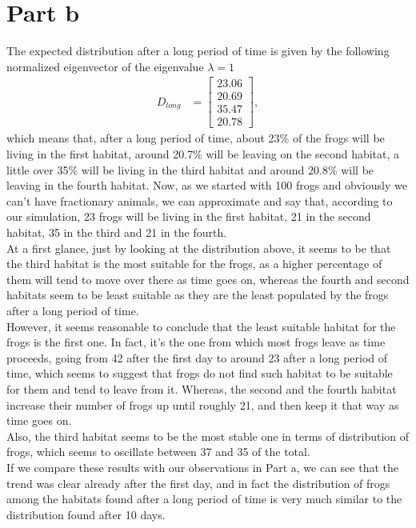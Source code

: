 \section{Part b}
The expected distribution after a long period of time is given by the following normalized eigenvector of the eigenvalue $\lambda=1$
\begin{align*}
    \textbf{$D_{long}$} &= \begin{bmatrix}
           23.06 \\
           20.69 \\
           35.47\\
           20.78
         \end{bmatrix},
\end{align*}
which means that, after a long period of time, about 23\% of the frogs will be living in the first habitat, around 20.7\% will be leaving on the second habitat, a little over 35\% will be living in the third habitat and around 20.8\% will be leaving in the fourth habitat. Now, as we started with 100 frogs and obviously we can't have fractionary animals, we can approximate and say that, according to our simulation, 23 frogs will be living in the first habitat, 21 in the second habitat, 35 in the third and 21 in the fourth. \\
At a first glance, just by looking at the distribution above, it seems to be that the third habitat is the most suitable for the frogs, as a higher percentage of them will tend to move over there as time goes on, whereas the fourth and second habitats seem to be least suitable as they are the least populated by the frogs after a long period of time.\\
However, it seems reasonable to conclude that the least suitable habitat for the frogs is the first one. In fact, it's the one from which most frogs leave as time proceeds, going from 42 after the first day to around 23 after a long period of time, which seems to suggest that frogs do not find such habitat to be suitable for them and tend to leave from it. Whereas, the second and the fourth habitat increase their number of frogs up until roughly 21, and then keep it that way as time goes on.\\
Also, the third habitat seems to be the most stable one in terms of distribution of frogs, which seems to oscillate between 37 and 35 of the total.\\
If we compare these results with our observations in Part a, we can see that the trend was clear already after the first day, and in fact the distribution of frogs among the habitats found after a long period of time is very much similar to the distribution found after 10 days.
